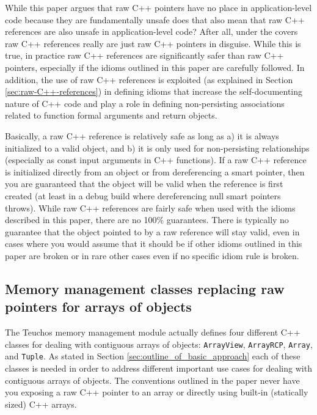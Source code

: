 \documentclass[pdf,ps2pdf,11pt]{SANDreport}
\begin{document}
While this paper argues that raw C++ pointers have no place in
application-level code because they are fundamentally unsafe does that
also mean that raw C++ references are also unsafe in application-level
code?  After all, under the covers raw C++ references really are just
raw C++ pointers in disguise.  While this is true, in practice raw C++
references are significantly safer than raw C++ pointers, especially
if the idioms outlined in this paper are carefully followed.  In
addition, the use of raw C++ references is exploited (as explained in
Section {}\ref{sec:raw-C++-references}) in defining idioms that
increase the self-documenting nature of C++ code and play a role in
defining non-persisting associations related to function formal
arguments and return objects.

Basically, a raw C++ reference is relatively safe as long as a) it is
always initialized to a valid object, and b) it is only used for
non-persisting relationships (especially as const input arguments in
C++ functions).  If a raw C++ reference is initialized directly from an
object or from dereferencing a smart pointer, then you are guaranteed
that the object will be valid when the reference is first created (at
least in a debug build where dereferencing null smart pointers
throws).  While raw C++ references are fairly safe when used with the
idioms described in this paper, there are no 100\% guarantees.  There
is typically no guarantee that the object pointed to by a raw reference
will stay valid, even in cases where you would assume that it should
be if other idioms outlined in this paper are broken or in rare other
cases even if no specific idiom rule is broken.


%
{}\subsection{Memory management classes replacing raw pointers for
arrays of objects}
\label{sec:array-classes}
%

The Teuchos memory management module actually defines four different
C++ classes for dealing with contiguous arrays of objects:
{}\texttt{ArrayView}, {}\texttt{ArrayRCP}, {}\texttt{Array}, and
{}\texttt{Tuple}.  As stated in Section
{}\ref{sec:outline_of_basic_approach} each of these classes is needed
in order to address different important use cases for dealing with
contiguous arrays of objects.  The conventions outlined in the paper
never have you exposing a raw C++ pointer to an array or directly
using built-in (statically sized) C++ arrays.
\end{document}
